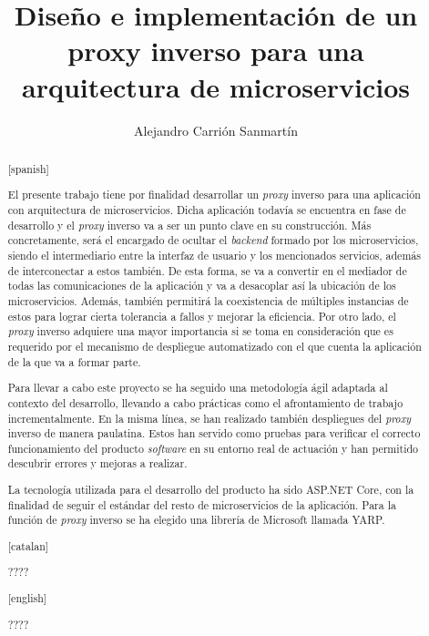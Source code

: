 \documentclass[11pt,spanish,listoffigures]{tfgetsinf}
\title{Diseño e implementación de un proxy inverso para una arquitectura de microservicios}
\author{Alejandro Carrión Sanmartín}
\begin{document}

\begin{abstract}[spanish]

El presente trabajo tiene por finalidad desarrollar un \emph{proxy} inverso para una aplicación con arquitectura de microservicios. Dicha aplicación todavía se encuentra en fase de desarrollo y el \emph{proxy} inverso va a ser un punto clave en su construcción. Más concretamente, será el encargado de ocultar el \emph{backend} formado por los microservicios, siendo el intermediario entre la interfaz de usuario y los mencionados servicios, además de interconectar a estos también. De esta forma, se va a convertir en el mediador de todas las comunicaciones de la aplicación y va a desacoplar así la ubicación de los microservicios. Además, también permitirá la coexistencia de múltiples instancias de estos para lograr cierta tolerancia a fallos y mejorar la eficiencia. Por otro lado, el \emph{proxy} inverso adquiere una mayor importancia si se toma en consideración que es requerido por el mecanismo de despliegue automatizado con el que cuenta la aplicación de la que va a formar parte.

Para llevar a cabo este proyecto se ha seguido una metodología ágil adaptada al contexto del desarrollo, llevando a cabo prácticas como el afrontamiento de trabajo incrementalmente. En la misma línea, se han realizado también despliegues del \emph{proxy} inverso de manera paulatina. Estos han servido como pruebas para verificar el correcto funcionamiento del producto \emph{software} en su entorno real de actuación y han permitido descubrir errores y mejoras a realizar.

La tecnología utilizada para el desarrollo del producto ha sido ASP.NET Core, con la finalidad de seguir el estándar del resto de microservicios de la aplicación. Para la función de \emph{proxy} inverso se ha elegido una librería de Microsoft llamada YARP.

\end{abstract}

\begin{abstract}[catalan]

????

\end{abstract}

\begin{abstract}[english]

????

\end{abstract}
\end{document}
